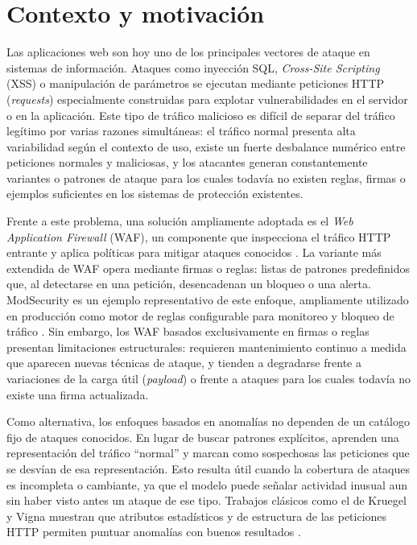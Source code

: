 \documentclass[12pt,oneside]{report}
\begin{document}
\section{Contexto y motivación}
Las aplicaciones web son hoy uno de los principales vectores de ataque en sistemas de información. Ataques como inyección SQL, \textit{Cross-Site Scripting} (XSS) o manipulación de parámetros se ejecutan mediante peticiones HTTP (\textit{requests}) especialmente construidas para explotar vulnerabilidades en el servidor o en la aplicación. Este tipo de tráfico malicioso es difícil de separar del tráfico legítimo por varias razones simultáneas: el tráfico normal presenta alta variabilidad según el contexto de uso, existe un fuerte desbalance numérico entre peticiones normales y maliciosas, y los atacantes generan constantemente variantes o patrones de ataque para los cuales todavía no existen reglas, firmas o ejemplos suficientes en los sistemas de protección existentes.

Frente a este problema, una solución ampliamente adoptada es el \textit{Web Application Firewall} (WAF), un componente que inspecciona el tráfico HTTP entrante y aplica políticas para mitigar ataques conocidos \cite{owasp_waf}. La variante más extendida de WAF opera mediante firmas o reglas: listas de patrones predefinidos que, al detectarse en una petición, desencadenan un bloqueo o una alerta. ModSecurity es un ejemplo representativo de este enfoque, ampliamente utilizado en producción como motor de reglas configurable para monitoreo y bloqueo de tráfico \cite{modsecurity_site}. Sin embargo, los WAF basados exclusivamente en firmas o reglas presentan limitaciones estructurales: requieren mantenimiento continuo a medida que aparecen nuevas técnicas de ataque, y tienden a degradarse frente a variaciones de la carga útil (\textit{payload}) o frente a ataques para los cuales todavía no existe una firma actualizada.

Como alternativa, los enfoques basados en anomalías no dependen de un catálogo fijo de ataques conocidos. En lugar de buscar patrones explícitos, aprenden una representación del tráfico ``normal'' y marcan como sospechosas las peticiones que se desvían de esa representación. Esto resulta útil cuando la cobertura de ataques es incompleta o cambiante, ya que el modelo puede señalar actividad inusual aun sin haber visto antes un ataque de ese tipo. Trabajos clásicos como el de Kruegel y Vigna muestran que atributos estadísticos y de estructura de las peticiones HTTP permiten puntuar anomalías con buenos resultados \cite{kruegel_vigna_2003}.
\end{document}

